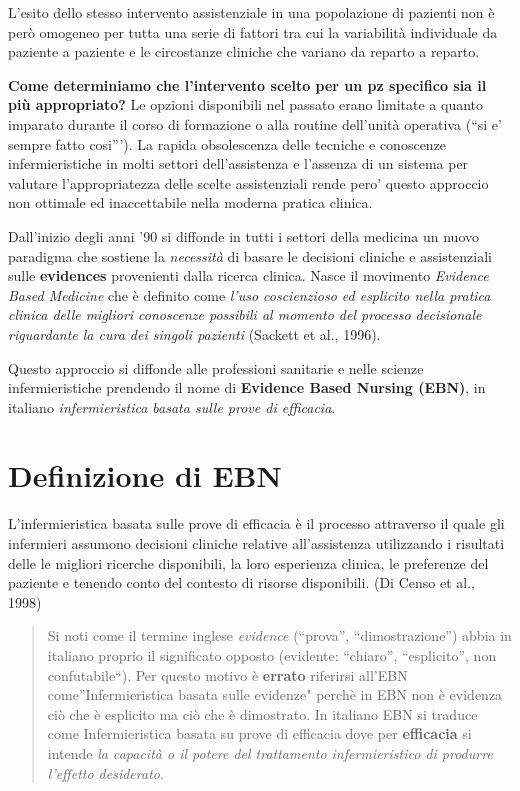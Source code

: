 \documentclass[]{book}
\begin{document}
L'esito dello stesso intervento assistenziale in una popolazione di pazienti non è però omogeneo per tutta una serie di fattori tra cui la variabilità individuale da paziente a paziente e le circostanze cliniche che variano da reparto a reparto.

\textbf{Come determiniamo che l'intervento scelto per un pz specifico sia il più appropriato?} Le opzioni disponibili nel passato erano limitate a quanto imparato durante il corso di formazione o alla routine dell'unità operativa (``si e' sempre fatto cosi'''). La rapida obsolescenza delle tecniche e conoscenze infermieristiche in molti settori dell'assistenza e l'assenza di un sistema per valutare l'appropriatezza delle scelte assistenziali rende pero' questo approccio non ottimale ed inaccettabile nella moderna pratica clinica.

Dall'inizio degli anni '90 si diffonde in tutti i settori della medicina un nuovo paradigma che sostiene la \emph{necessità} di basare le decisioni cliniche e assistenziali sulle \textbf{evidences} provenienti dalla ricerca clinica. Nasce il movimento \emph{Evidence Based Medicine} che è definito come \emph{l'uso coscienzioso ed esplicito nella pratica clinica delle migliori conoscenze possibili al momento del processo decisionale riguardante la cura dei singoli pazienti} (Sackett et al., 1996).

Questo approccio si diffonde alle professioni sanitarie e nelle scienze infermieristiche prendendo il nome di \textbf{Evidence Based Nursing (EBN)}, in italiano \emph{infermieristica basata sulle prove di efficacia}.

\hypertarget{definizione-di-ebn}{%
\section{Definizione di EBN}\label{definizione-di-ebn}}

L'infermieristica basata sulle prove di efficacia è il processo attraverso il quale gli infermieri assumono decisioni cliniche relative all'assistenza utilizzando i risultati delle le migliori ricerche disponibili, la loro esperienza clinica, le preferenze del paziente e tenendo conto del contesto di risorse disponibili. (Di Censo et al., 1998)

\begin{quote}
Si noti come il termine inglese \emph{evidence} (``prova'', ``dimostrazione'') abbia in italiano proprio il significato opposto (evidente: ``chiaro'', ``esplicito'', non confutabile``). Per questo motivo è \textbf{errato} riferirsi all'EBN come''Infermieristica basata sulle evidenze" perchè in EBN non è evidenza ciò che è esplicito ma ciò che è dimostrato. In italiano EBN si traduce come Infermieristica basata su prove di efficacia dove per \textbf{efficacia} si intende \emph{la capacità o il potere del trattamento infermieristico di produrre l'effetto desiderato}.
\end{quote}
\end{document}
